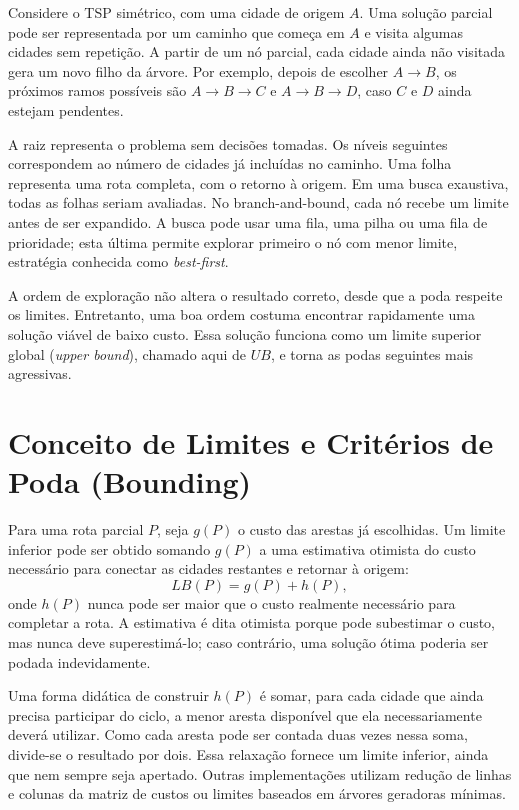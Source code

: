 Considere o TSP simétrico, com uma cidade de origem $A$. Uma solução parcial pode ser representada por um caminho que começa em $A$ e visita algumas cidades sem repetição. A partir de um nó parcial, cada cidade ainda não visitada gera um novo filho da árvore. Por exemplo, depois de escolher $A \rightarrow B$, os próximos ramos possíveis são $A \rightarrow B \rightarrow C$ e $A \rightarrow B \rightarrow D$, caso $C$ e $D$ ainda estejam pendentes.

A raiz representa o problema sem decisões tomadas. Os níveis seguintes correspondem ao número de cidades já incluídas no caminho. Uma folha representa uma rota completa, com o retorno à origem. Em uma busca exaustiva, todas as folhas seriam avaliadas. No branch-and-bound, cada nó recebe um limite antes de ser expandido. A busca pode usar uma fila, uma pilha ou uma fila de prioridade; esta última permite explorar primeiro o nó com menor limite, estratégia conhecida como \textit{best-first}.

A ordem de exploração não altera o resultado correto, desde que a poda respeite os limites. Entretanto, uma boa ordem costuma encontrar rapidamente uma solução viável de baixo custo. Essa solução funciona como um limite superior global (\textit{upper bound}), chamado aqui de $UB$, e torna as podas seguintes mais agressivas.

\section{Conceito de Limites e Critérios de Poda (Bounding)}

Para uma rota parcial $P$, seja $g(P)$ o custo das arestas já escolhidas. Um limite inferior pode ser obtido somando $g(P)$ a uma estimativa otimista do custo necessário para conectar as cidades restantes e retornar à origem:
\begin{equation}
    LB(P) = g(P) + h(P),
\end{equation}
onde $h(P)$ nunca pode ser maior que o custo realmente necessário para completar a rota. A estimativa é dita otimista porque pode subestimar o custo, mas nunca deve superestimá-lo; caso contrário, uma solução ótima poderia ser podada indevidamente.

Uma forma didática de construir $h(P)$ é somar, para cada cidade que ainda precisa participar do ciclo, a menor aresta disponível que ela necessariamente deverá utilizar. Como cada aresta pode ser contada duas vezes nessa soma, divide-se o resultado por dois. Essa relaxação fornece um limite inferior, ainda que nem sempre seja apertado. Outras implementações utilizam redução de linhas e colunas da matriz de custos ou limites baseados em árvores geradoras mínimas.

